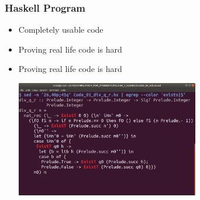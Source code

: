 
\begin{frame}

\frametitle{Haskell Program}

\begin{itemize}

\item Completely usable code

\item Proving real life code is hard

\item Proving real life code is hard

\begin{center}
\includegraphics[width=8cm]{FOLDER_3_IMG_FILES/Code_01_div_q_r_hs_whole.png}
\end{center}

\end{itemize}

\end{frame}
